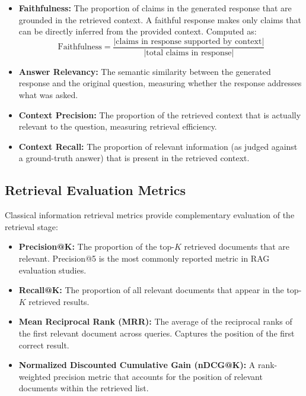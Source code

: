\begin{itemize}
  \item \textbf{Faithfulness:} The proportion of claims in the generated response that are grounded in the retrieved context. A faithful response makes only claims that can be directly inferred from the provided context. Computed as:
  \begin{equation}
    \text{Faithfulness} = \frac{|\text{claims in response supported by context}|}{|\text{total claims in response}|}
    \label{eq:faithfulness}
  \end{equation}

  \item \textbf{Answer Relevancy:} The semantic similarity between the generated response and the original question, measuring whether the response addresses what was asked.

  \item \textbf{Context Precision:} The proportion of the retrieved context that is actually relevant to the question, measuring retrieval efficiency.

  \item \textbf{Context Recall:} The proportion of relevant information (as judged against a ground-truth answer) that is present in the retrieved context.
\end{itemize}

\subsection{Retrieval Evaluation Metrics}

Classical information retrieval metrics provide complementary evaluation of the retrieval stage:

\begin{itemize}
  \item \textbf{Precision@K:} The proportion of the top-$K$ retrieved documents that are relevant. Precision@5 is the most commonly reported metric in RAG evaluation studies.
  \item \textbf{Recall@K:} The proportion of all relevant documents that appear in the top-$K$ retrieved results.
  \item \textbf{Mean Reciprocal Rank (MRR):} The average of the reciprocal ranks of the first relevant document across queries. Captures the position of the first correct result.
  \item \textbf{Normalized Discounted Cumulative Gain (nDCG@K):} A rank-weighted precision metric that accounts for the position of relevant documents within the retrieved list.
\end{itemize}

